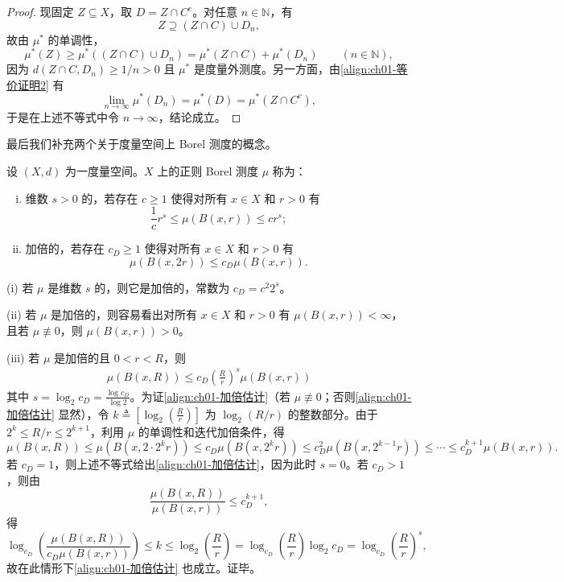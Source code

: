 \documentclass[../../main.tex]{subfiles}%
\begin{document}
\begin{proof}
现固定 $Z\subseteq X$，取 $D=Z\cap C^c$。对任意 $n\in\mathbb{N}$，有
\[
Z\supseteq(Z\cap C)\cup D_n,
\]
故由 $\mu^*$ 的单调性，
\[
\mu^*(Z)\geqslant\mu^*((Z\cap C)\cup D_n)=\mu^*(Z\cap C)+\mu^*(D_n)\qquad(n\in\mathbb{N}),
\]
因为 $d(Z\cap C,D_n)\geqslant 1/n>0$ 且 $\mu^*$ 是度量外测度。另一方面，由\eqref{align:ch01-等价证明2} 有
\[
\lim_{n\to\infty}\mu^*(D_n)=\mu^*(D)=\mu^*(Z\cap C^c),
\]
于是在上述不等式中令 $n\to\infty$，结论成立。
\end{proof}

最后我们补充两个关于度量空间上 Borel 测度的概念。

\begin{definition}\label{definition:ch01-加倍测度}
设 $(X,d)$ 为一度量空间。$X$ 上的正则 Borel 测度 $\mu$ 称为：
\begin{enumerate}[(i)]
\item 维数 $s>0$ 的，若存在 $c\geqslant 1$ 使得对所有 $x\in X$ 和 $r>0$ 有
\[
\frac{1}{c}r^s\leqslant\mu(B(x,r))\leqslant cr^s;
\]
\item 加倍的，若存在 $c_D\geqslant 1$ 使得对所有 $x\in X$ 和 $r>0$ 有
\[
\mu(B(x,2r))\leqslant c_D\mu(B(x,r)).
\]
\end{enumerate}
\end{definition}

\begin{remark}\label{remark:ch01-加倍性质}
(i) 若 $\mu$ 是维数 $s$ 的，则它是加倍的，常数为 $c_D=c^2 2^s$。

(ii) 若 $\mu$ 是加倍的，则容易看出对所有 $x\in X$ 和 $r>0$ 有 $\mu(B(x,r))<\infty$，且若 $\mu\not\equiv 0$，则 $\mu(B(x,r))>0$。

(iii) 若 $\mu$ 是加倍的且 $0<r<R$，则
\begin{align}
\mu(B(x,R))\leqslant c_D\left(\frac{R}{r}\right)^s\mu(B(x,r)) \label{align:ch01-加倍估计}
\end{align}
其中 $s=\log_2 c_D=\frac{\log c_D}{\log 2}$。为证\eqref{align:ch01-加倍估计}（若 $\mu\not\equiv 0$；否则\eqref{align:ch01-加倍估计} 显然），令 $k\triangleq \left[\log_2\left(\frac{R}{r}\right)\right]$ 为 $\log_2(R/r)$ 的整数部分。由于 $2^k\leqslant R/r\leqslant 2^{k+1}$，利用 $\mu$ 的单调性和迭代加倍条件，得
\[
\mu(B(x,R))\leqslant\mu(B(x,2\cdot 2^k r))\leqslant c_D\mu(B(x,2^k r))
\leqslant c_D^2\mu(B(x,2^{k-1}r))\leqslant\cdots\leqslant c_D^{k+1}\mu(B(x,r)).
\]
若 $c_D=1$，则上述不等式给出\eqref{align:ch01-加倍估计}，因为此时 $s=0$。若 $c_D>1$，则由
\[
\frac{\mu(B(x,R))}{\mu(B(x,r))}\leqslant c_D^{k+1},
\]
得
\[
\log_{c_D}\left(\frac{\mu(B(x,R))}{c_D\mu(B(x,r))}\right)\leqslant k\leqslant\log_2\left(\frac{R}{r}\right)
=\log_{c_D}\left(\frac{R}{r}\right)\log_2 c_D
=\log_{c_D}\left(\frac{R}{r}\right)^s,
\]
故在此情形下\eqref{align:ch01-加倍估计} 也成立。证毕。
\end{remark}
\end{document}
